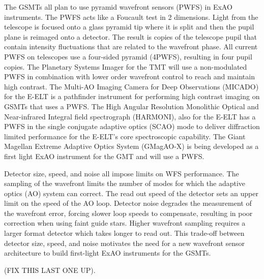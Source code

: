 The GSMTs all plan to use pyramid wavefront sensors (PWFS) in ExAO instruments. The PWFS acts like a Foucault test in 2 dimensions. Light from the telescope is focused onto a glass pyramid tip where it is split and then the pupil plane is reimaged onto a detector. The result is copies of the telescope pupil that contain intensity fluctuations that are related to the wavefront phase. All current PWFS on telescopes use a four-sided pyramid (4PWFS), resulting in four pupil copies. The Planetary Systems Imager \cite{fitzgerald2019planetary} for the TMT will use a non-modulated PWFS\cite{guyon2018wavefront} in combination with lower order wavefront control to reach and maintain high contrast. The Multi-AO Imaging Camera for Deep Observations (MICADO)\cite{davies2018micado} for the E-ELT is a pathfinder instrument for performing high contrast imaging on GSMTs that uses a PWFS. The High Angular Resolution Monolithic Optical and Near-infrared Integral field spectrograph (HARMONI)\cite{neichel2016adaptive}, also for the E-ELT has a PWFS in the single conjugate adaptive optics (SCAO) mode to deliver diffraction limited performance for the E-ELT's core spectroscopic capability. The Giant Magellan Extreme Adaptive Optics System (GMagAO-X)\cite{males2019gmagao} is being developed as a first light ExAO instrument for the GMT and will use a PWFS. 

Detector size, speed, and noise all impose limits on WFS performance. The sampling of the wavefront limits the number of modes for which the adaptive optics (AO) system can correct. The read out speed of the detector sets an upper limit on the speed of the AO loop. Detector noise degrades the measurement of the wavefront error, forcing slower loop speeds to compensate, resulting in poor correction when using faint guide stars. Higher wavefront sampling requires a larger format detector which takes longer to read out. This trade-off between detector size, speed, and noise motivates the need for a new wavefront sensor architecture to build first-light ExAO instruments for the GSMTs.

(FIX THIS LAST ONE UP).


